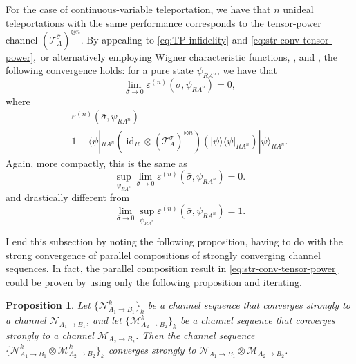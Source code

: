 \documentclass[apsrev,twocolumn]{revtex4-1}%
\newtheorem{proposition}[theorem]{Proposition}
\begin{document}
For the case of continuous-variable teleportation, we have that $n$ unideal
teleportations with the same performance corresponds to the tensor-power
channel $(\mathcal{T}_{A}^{\bar{\sigma}})^{\otimes n}$. By appealing to
\eqref{eq:TP-infidelity} and \eqref{eq:str-conv-tensor-power},\ or
alternatively employing Wigner characteristic functions, \cite[Theorem~5.4.1]%
{Hol11}, and \cite[Theorem~9.8]{WZ77}, the following convergence holds: for a
pure state $\psi_{RA^{n}}$, we have that%
\begin{equation}
\lim_{\bar{\sigma}\rightarrow0}\varepsilon^{(n)}(\bar{\sigma},\psi_{RA^{n}%
})=0, \label{eq:n-converge-tele}%
\end{equation}
where%
\begin{multline}
\varepsilon^{(n)}(\bar{\sigma},\psi_{RA^{n}})\equiv\\
1-\langle\psi|_{RA^{n}}(\operatorname{id}_{R}\otimes(\mathcal{T}_{A}%
^{\bar{\sigma}})^{\otimes n})(|\psi\rangle\langle\psi|_{RA^{n}})|\psi
\rangle_{RA^{n}}.
\end{multline}
Again, more compactly, this is the same as%
\begin{equation}
\sup_{\psi_{RA^{n}}}\lim_{\bar{\sigma}\rightarrow0}\varepsilon^{(n)}%
(\bar{\sigma},\psi_{RA^{n}})=0.
\end{equation}
and drastically different from
\begin{equation}
\lim_{\bar{\sigma}\rightarrow0}\sup_{\psi_{RA^{n}}}\varepsilon^{(n)}%
(\bar{\sigma},\psi_{RA^{n}})=1.
\end{equation}


I end this subsection by noting the following proposition, having to do with
the strong convergence of parallel compositions of strongly converging channel
sequences. In fact, the parallel composition result in
\eqref{eq:str-conv-tensor-power} could be proven by using only the following
proposition and iterating.

\begin{proposition}
\label{prop:parallel-comp} Let $\{\mathcal{N}_{A_{1}\rightarrow B_{1}}%
^{k}\}_{k}$ be a channel sequence that converges strongly to a channel
$\mathcal{N}_{A_{1}\rightarrow B_{1}}$, and let $\{\mathcal{M}_{A_{2}%
\rightarrow B_{2}}^{k}\}_{k}$ be a channel sequence that converges strongly to
a channel $\mathcal{M}_{A_{2}\rightarrow B_{2}}$. Then the channel sequence
$\{\mathcal{N}_{A_{1}\rightarrow B_{1}}^{k}\otimes\mathcal{M}_{A_{2}%
\rightarrow B_{2}}^{k}\}_{k}$ converges strongly to $\mathcal{N}%
_{A_{1}\rightarrow B_{1}}\otimes\mathcal{M}_{A_{2}\rightarrow B_{2}}$.
\end{proposition}
\end{document}
